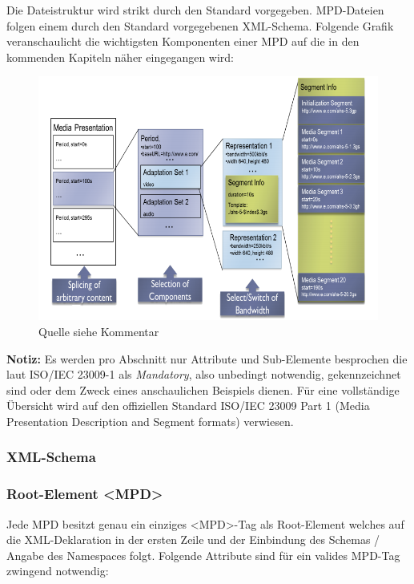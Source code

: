 \documentclass[paper = a4, fontsize = 12pt, parskip = half]{scrartcl} %
\begin{document}
Die Dateistruktur wird strikt durch den Standard vorgegeben. MPD-Dateien folgen einem durch den Standard vorgegebenen XML-Schema. Folgende Grafik veranschaulicht die wichtigsten Komponenten einer MPD auf die in den kommenden Kapiteln näher eingegangen wird:

\begin{center}
	\begin{figure}[h!]
		\includegraphics[width=12cm]{images/mpd-structure.png}
		\caption{Quelle siehe Kommentar}
	\end{figure}
\end{center}

\textbf{Notiz:} Es werden pro Abschnitt nur Attribute und Sub-Elemente besprochen die laut ISO/IEC 23009-1 als \textit{Mandatory}, also unbedingt notwendig, gekennzeichnet sind oder dem Zweck eines anschaulichen Beispiels dienen. Für eine vollständige Übersicht wird auf den offiziellen Standard ISO/IEC 23009 Part 1 (Media Presentation Description and Segment formats) verwiesen.

\subsubsection{XML-Schema}

\subsubsection{Root-Element <MPD>}
Jede MPD besitzt genau ein einziges <MPD>-Tag als Root-Element welches auf die XML-Deklaration in der ersten Zeile und der Einbindung des Schemas / Angabe des Namespaces folgt.
Folgende Attribute sind für ein valides MPD-Tag zwingend notwendig:
\end{document}
